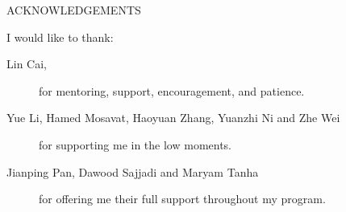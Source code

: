 \newpage
{}

\begin{center}
ACKNOWLEDGEMENTS
\end{center}

\noindent I would like to thank:
\begin{description}
\item[Lin Cai,]
	for  mentoring, support, encouragement, and patience. 
\item[Yue Li, Hamed Mosavat, Haoyuan Zhang, Yuanzhi Ni and Zhe Wei]
	for supporting me in the low moments.
\item[Jianping Pan, Dawood Sajjadi and Maryam Tanha]
	for offering me their full support throughout my program.
\end{description}


